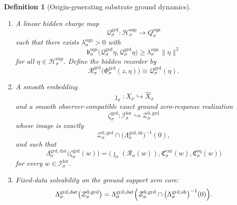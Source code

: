 \documentclass[11pt]{article}
\newcommand{\ForSpace}[1]{\mathcal I_{#1}^{\mathrm{for}}}
\newcommand{\Reduction}[1]{\mathcal R_{#1}}
\newcommand{\CurrentCarrier}[1]{\mathfrak C_{#1}^{\mathrm{cur}}}
\newcommand{\EqCarrier}[1]{\mathfrak C_{#1}^{\mathrm{eq}}}
\newcommand{\VisibleAffine}[1]{\widehat X_{#1}}
\newcommand{\SeedHidden}[1]{\mathcal H_{#1}^{\mathrm{sup}}}
\newcommand{\GroundData}[1]{\Lambda_{#1}^{\mathrm{grd,dat}}}
\newcommand{\GroundShellMap}[1]{\Lambda_{#1}^{\mathrm{grd,sh}}}
\newcommand{\GroundZeroCore}[1]{\mathcal Z_{#1}^{0,\mathrm{grd}}}
\newcommand{\GroundSplit}[1]{\Phi_{#1}^{\mathrm{grd}}}
\newcommand{\GroundCharge}[1]{\mathcal Q_{#1}^{\mathrm{grd}}}
\newcommand{\GroundResidual}[1]{\mathcal R_{#1}^{\mathrm{grd}}}
\newcommand{\GroundEmbed}[1]{\zeta_{#1}^{\mathrm{grd}}}
\newcommand{\EqnTarget}[1]{Q_{#1}^{\mathrm{eqn}}}
\newcommand{\EqnPair}[1]{\mathfrak b_{#1}^{\mathrm{eqn}}}
\newtheorem{definition}{Definition}
\begin{document}
\begin{definition}[Origin-generating substrate ground dynamics]
\begin{enumerate}
    \item A linear hidden charge map
    \[
    \GroundCharge{\sigma}:\SeedHidden{\sigma}\to\EqnTarget{\sigma}
    \]
    such that there exists \(\lambda_{\sigma}^{\mathrm{eqn}}>0\) with
    \begin{equation}
    \EqnPair{\sigma}\bigl(\GroundCharge{\sigma}\eta,\GroundCharge{\sigma}\eta\bigr)
    \ge
    \lambda_{\sigma}^{\mathrm{eqn}}\,
    \|\eta\|^{2}
    \label{eq:groundchargegap}
    \end{equation}
    for all \(\eta\in\SeedHidden{\sigma}\). Define the hidden recorder by
    \begin{equation}
    \GroundResidual{\sigma}\bigl(\GroundSplit{\sigma}(z,\eta)\bigr)
    \equiv
    \GroundCharge{\sigma}(\eta).
    \label{eq:groundresidual}
    \end{equation}

    \item A smooth embedding
    \[
    \jmath_{\sigma}:X_{\sigma}\hookrightarrow\VisibleAffine{\sigma}
    \]
    and a smooth observer-compatible exact ground zero-response realization
    \[
    \GroundEmbed{\sigma}:\ForSpace{\sigma}\hookrightarrow\GroundZeroCore{\sigma}
    \]
    whose image is exactly
    \[
    \GroundZeroCore{\sigma}
    \cap
    \bigl(\GroundShellMap{\sigma}\bigr)^{-1}(0),
    \]
    and such that
    \begin{equation}
    \GroundData{\sigma}\bigl(\GroundEmbed{\sigma}(w)\bigr)
    =
    \bigl(
    \jmath_{\sigma}(\Reduction{\sigma}(w)),
    \CurrentCarrier{\sigma}(w),
    \EqCarrier{\sigma}(w)
    \bigr)
    \label{eq:groundcompat}
    \end{equation}
    for every \(w\in\ForSpace{\sigma}\).

    \item Fixed-data solvability on the ground support zero core:
    \begin{equation}
    \GroundData{\sigma}\bigl(\GroundZeroCore{\sigma}\bigr)
    =
    \GroundData{\sigma}\Bigl(
    \GroundZeroCore{\sigma}\cap
    \bigl(\GroundShellMap{\sigma}\bigr)^{-1}(0)
    \Bigr).
    \label{eq:groundsolvability}
    \end{equation}


\end{enumerate}
\end{definition}
\end{document}
